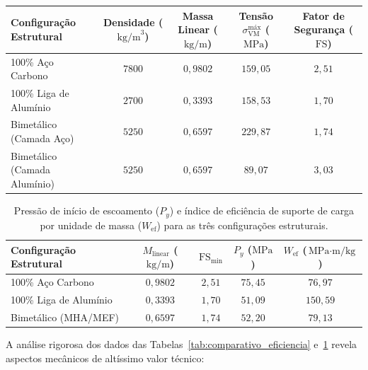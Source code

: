\begin{quadro}[htbp]
  \centering
  \caption{Estudo comparativo de eficiência estrutural, tensões equivalentes de Von Mises, fatores de segurança e alívio de massa sob pressão de projeto de $30 \, \text{MPa}$.}
  \label{tab:comparativo_eficiencia}
  \begin{tabular}{l c c c c}
    \hline
    \textbf{Configuração Estrutural} & \textbf{Densidade ($\text{kg/m}^3$)} & \textbf{Massa Linear ($\text{kg/m}$)} & \textbf{Tensão $\sigma_{\text{VM}}^{\text{máx}}$ ($\text{MPa}$)} & \textbf{Fator de Segurança ($\text{FS}$)} \\ \hline
    100\% Aço Carbono & $7800$ & $0,9802$ & $159,05$ & $2,51$ \\ \hline
    100\% Liga de Alumínio & $2700$ & $0,3393$ & $158,53$ & $1,70$ \\ \hline
    Bimetálico (Camada Aço) & $5250$ & $0,6597$ & $229,87$ & $1,74$ \\ \hline
    Bimetálico (Camada Alumínio) & $5250$ & $0,6597$ & $89,07$ & $3,03$ \\ \hline
  \end{tabular}
\end{quadro}

\begin{table}[htbp]
  \centering
  \caption{Pressão de início de escoamento ($P_y$) e índice de eficiência de suporte de carga por unidade de massa ($W_{\text{ef}}$) para as três configurações estruturais.}
  \label{tab:indice_eficiencia_massa}
  \begin{tabular}{l c c c c}
    \hline
    \textbf{Configuração Estrutural} & \textbf{$M_{\text{linear}}$ ($\text{kg/m}$)} & \textbf{$\text{FS}_{\min}$} & \textbf{$P_y$ ($\text{MPa}$)} & \textbf{$W_{\text{ef}}$ ($\text{MPa} \cdot \text{m/kg}$)} \\ \hline
    100\% Aço Carbono & $0,9802$ & $2,51$ & $75,45$ & $76,97$ \\ \hline
    100\% Liga de Alumínio & $0,3393$ & $1,70$ & $51,09$ & $150,59$ \\ \hline
    Bimetálico (MHA/MEF) & $0,6597$ & $1,74$ & $52,20$ & $79,13$ \\ \hline
  \end{tabular}
\end{table}

A análise rigorosa dos dados das Tabelas~\ref{tab:comparativo_eficiencia} e~\ref{tab:indice_eficiencia_massa} revela aspectos mecânicos de altíssimo valor técnico:

